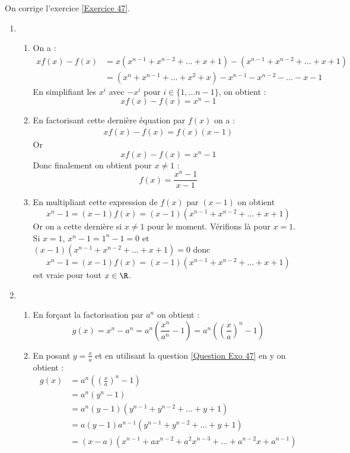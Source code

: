 \documentclass[12pt,fleqn]{report} %
\begin{document}
\begin{correction}
	On corrige l'exercice \ref{Exercice 47}.\\
	\begin{enumerate}
		\item \begin{enumerate}
			\item On a : \begin{align*}
			x f(x) - f(x) & = x \left(x^{n-1} + x^{n-2} + \dots + x + 1\right) - \left(x^{n-1} + x^{n-2} + \dots + x + 1\right)  \\
			& = \left(x^{n} + x^{n-1} + \dots + x^2 + x\right) - x^{n-1} - x^{n-2} - \dots - x - 1
			\end{align*}
			En simplifiant les $x^i$ avec $-x^i$ pour $i \in \lbrace 1,\dots n-1 \rbrace$, on obtient : 
			\[
			xf(x) -f(x) = x^n - 1
			\]
			\item En factorisant cette dernière équation par $f(x)$ on a : 
			\begin{align*}
			xf(x) - f(x) =  f(x)(x-1) 
			\end{align*}
			Or \[
			xf(x) - f(x) = x^n - 1 
			\]
			Donc finalement on obtient pour $x \neq 1$ : 
			\[
			f(x) = \frac{x^n-1}{x - 1}
			\]
			\item En multipliant cette expression de $f(x)$ par $(x-1)$ on obtient \[
			x^n - 1 = (x-1)f(x) = (x-1)\left(x^{n-1} + x^{n-2} + \dots + x + 1\right)
			\]
			Or on a cette dernière si $x\neq 1$ pour le moment. Vérifions là pour $x=1$. \\
			Si $x = 1$, $x^n -1 = 1^n -1 = 0$ et $(x-1)\left(x^{n-1} + x^{n-2} + \dots + x + 1\right) = 0$ donc 
			\[
			x^n - 1 = (x-1)f(x) = (x-1)\left(x^{n-1} + x^{n-2} + \dots + x + 1\right)
			\] est vraie pour tout $x\in \R$. 
		\end{enumerate}
		\item \begin{enumerate}
			\item En forçant la factorisation par $a^n$ on obtient : \[
			g(x) = x^n - a^n = a^n \left(\frac{x^n}{a^n} - 1\right)  = a^n \left(\left(\frac{x}{a}\right)^n - 1\right)
			\]
			\item En posant $y = \frac{x}{a}$ et en utilisant la question \ref{Question Exo 47} en y on obtient : 
			\begin{align*}
			g(x) & = a^n \left(\left(\frac{x}{a}\right)^n - 1\right) \\ 
			& = a^n \left(y^n - 1\right) \\ 
			& = a^n (y - 1)\left(y^{n-1} + y^{n-2} + \dots + y + 1\right) \\
			& = a (y - 1) a^{n-1}\left(y^{n-1} + y^{n-2} + \dots + y + 1\right) \\
			& = (x-a)\left(x^{n-1} + a x^{n-2} + a^2 x^{n-3} + \dots + a^{n-2}x + a^{n-1}\right)
			\end{align*}
		\end{enumerate}
	\end{enumerate}
\end{correction}
\end{document}
